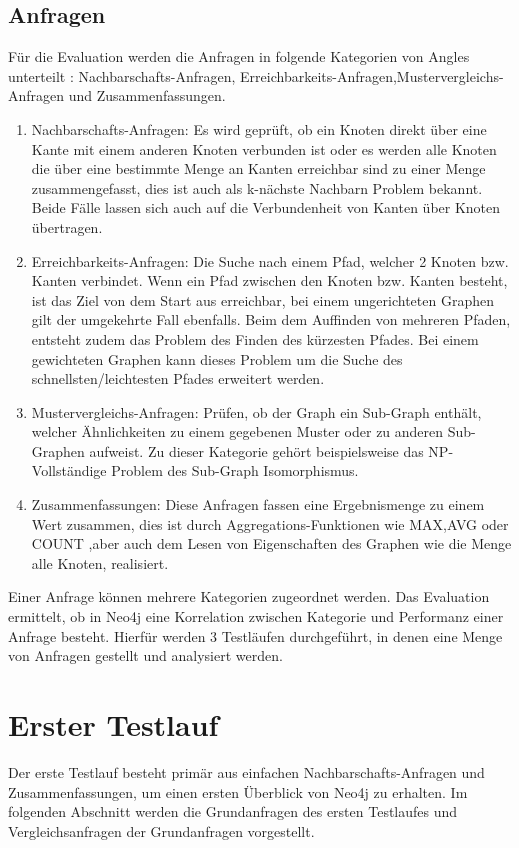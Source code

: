 \subsection{Anfragen} \label{Kategorien}
Für die Evaluation werden die Anfragen in folgende Kategorien von Angles unterteilt \parencite{angles2012comparison}: Nachbarschafts-Anfragen, Erreichbarkeits-Anfragen,Mustervergleichs-Anfragen und  Zusammenfassungen. 
\begin{enumerate}
	\item Nachbarschafts-Anfragen: Es wird geprüft, ob ein Knoten direkt über eine  Kante mit einem anderen Knoten verbunden ist oder  es werden alle Knoten die über eine bestimmte Menge an Kanten erreichbar sind zu einer Menge zusammengefasst, dies ist auch als k-nächste Nachbarn Problem bekannt. Beide Fälle lassen sich auch auf die Verbundenheit von Kanten über Knoten übertragen.
	\item Erreichbarkeits-Anfragen: Die Suche nach einem Pfad, welcher 2 Knoten bzw. Kanten verbindet. Wenn ein Pfad zwischen den Knoten bzw. Kanten besteht, ist das Ziel von dem Start aus erreichbar, bei einem ungerichteten Graphen gilt der umgekehrte Fall ebenfalls. Beim dem Auffinden von mehreren Pfaden, entsteht zudem das Problem des Finden des kürzesten Pfades. Bei einem gewichteten Graphen kann dieses Problem um die Suche des schnellsten/leichtesten Pfades  erweitert werden. 
	\item Mustervergleichs-Anfragen: Prüfen, ob der Graph ein Sub-Graph enthält, welcher Ähnlichkeiten zu einem gegebenen Muster oder zu anderen Sub-Graphen aufweist. Zu dieser Kategorie gehört beispielsweise das NP-Vollständige Problem des Sub-Graph Isomorphismus. 
	\item Zusammenfassungen: Diese Anfragen fassen eine Ergebnismenge zu einem Wert zusammen, dies ist durch Aggregations-Funktionen wie MAX,AVG oder COUNT ,aber auch dem Lesen von Eigenschaften des Graphen wie die Menge alle Knoten, realisiert. 
\end{enumerate}
Einer Anfrage können mehrere Kategorien zugeordnet werden. Das Evaluation ermittelt, ob in Neo4j eine Korrelation zwischen Kategorie und Performanz einer Anfrage besteht. Hierfür werden 3 Testläufen durchgeführt, in denen eine Menge von Anfragen gestellt und analysiert werden. 
\section{Erster Testlauf}
Der erste Testlauf besteht primär aus einfachen Nachbarschafts-Anfragen und Zusammenfassungen, um einen ersten Überblick von Neo4j zu erhalten. Im folgenden Abschnitt werden die Grundanfragen des ersten Testlaufes und Vergleichsanfragen der Grundanfragen vorgestellt. 
